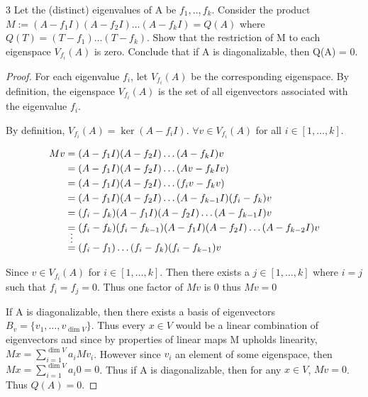 \documentclass{article}
\begin{document}
\begin{PROB}{3}\label{Problem 3.}
    Let the (distinct) eigenvalues of A be  $f_1,..,f_k$. Consider the product $M :=(A - f_1 I)(A - f_2 I) \ldots (A - f_k I) = Q(A)$ where $Q(T) = (T - f_1)\ldots(T - f_k)$.
    Show that the restriction of M to each eigenspace $V_{f_i}(A)$ is zero. Conclude that if A is diagonalizable, then Q(A) = 0. 
\end{PROB}
\begin{proof}
    For each eigenvalue $f_i$, let $V_{f_i}(A)$ be the corresponding eigenspace. By definition, the eigenspace $V_{f_i}(A)$ is the set of all eigenvectors associated with the eigenvalue $f_i$. 
    
    By definition, $V_{f_i}(A) = \ker(A - f_iI)$. $\forall v \in V_{f_i}(A)$ for all $i \in [1, \ldots, k]$.

    \begin{align*}{}
        Mv &= (A - f_1 I)(A - f_2 I) \ldots (A - f_k I)v \\
        &= (A - f_1 I)(A - f_2 I) \ldots (Av - f_kIv) \\
        &= (A - f_1 I)(A - f_2 I) \ldots (f_iv - f_kv) \\
        &= (A - f_1 I)(A - f_2 I) \ldots (A - f_{k-1}I)(f_i - f_k)v \\
        &=(f_i - f_k)(A - f_1 I)(A - f_2 I) \ldots (A - f_{k-1}I)v \\
        &=(f_i - f_k)(f_i - f_{k-1})(A - f_1 I)(A - f_2 I) \ldots (A - f_{k-2}I)v\\
        &\shortvdotswithin{=}
        &= (f_i - f_1) \ldots (f_i - f_k)(f_i - f_{k-1})v\\
    \end{align*}


    Since $v \in V_{f_i}(A)$ for $i \in [1, \ldots, k]$. Then there exists a $j \in [1, \ldots, k]$ where $i = j$ such that $f_i = f_j = 0$. Thus one factor of $Mv$ is 0 thus $Mv = 0$

    If A is diagonalizable, then there exists a basis of eigenvectors $B_v = \{v_1, \ldots, v_{\dim V}\}$. Thus every $x \in V$ would be a linear combination of eigenvectors and since by properties of linear maps M upholds linearity, $Mx = \sum_{i=1}^{\dim V}a_iMv_i$. However since $v_i$ an element of some eigenspace, then $Mx =\sum_{i=1}^{\dim V}a_i0 = 0$. Thus if A is diagonalizable, then for any $x \in V$, $Mv = 0$. Thus $Q(A) = 0$.
\end{proof}
\end{document}
